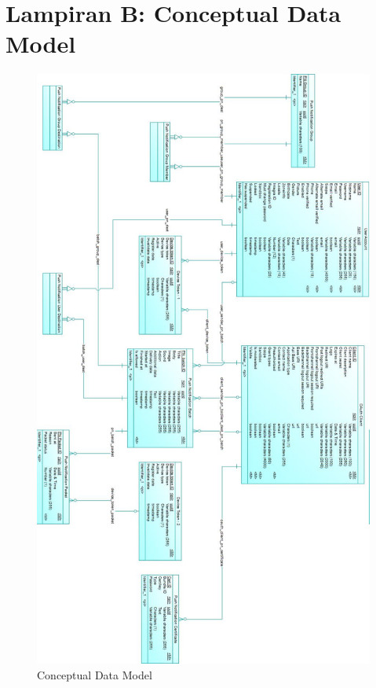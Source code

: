 \chapter{Lampiran B: Conceptual Data Model} \label{lampiran:cdm}
\begin{figure}[H]
	\centering\includegraphics[height=0.82\textheight]{penutup/lampiran/b/CDM.jpg}
	\caption{Conceptual Data Model}
\end{figure}
